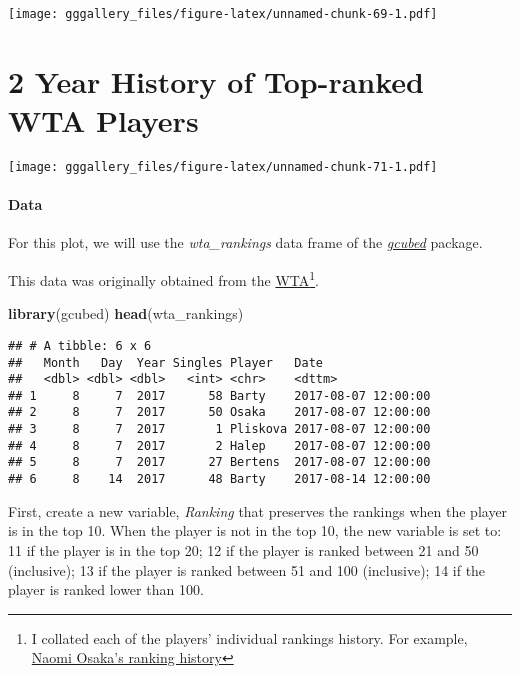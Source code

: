 \documentclass[]{book}
\newenvironment{Shaded}{\begin{snugshade}}{\end{snugshade}}
\newcommand{\KeywordTok}[1]{\textcolor[rgb]{0.13,0.29,0.53}{\textbf{#1}}}
\newcommand{\NormalTok}[1]{#1}
\let\rmarkdownfootnote\footnote%
\def\footnote{\protect\rmarkdownfootnote}
\begin{document}
\texttt{[image: gggallery\_files/figure-latex/unnamed-chunk-69-1.pdf]}

\hypertarget{wta}{%
\chapter*{2 Year History of Top-ranked WTA Players}\label{wta}}

\texttt{[image: gggallery\_files/figure-latex/unnamed-chunk-71-1.pdf]}

\hypertarget{wtadata}{%
\subsubsection*{Data}\label{wtadata}}

For this plot, we will use the \emph{wta\_rankings} data frame of the \protect\hyperlink{gcubed}{\emph{gcubed}} package.

This data was originally obtained from the \href{https://www.wtatennis.com/}{WTA}\footnote{I collated each of the players' individual rankings history. For example, \href{https://www.wtatennis.com/players/player/319998/title/naomi-osaka-0\#ranking}{Naomi Osaka's ranking history}}.

\begin{Shaded}
\begin{Highlighting}[]
\KeywordTok{library}\NormalTok{(gcubed)}
\KeywordTok{head}\NormalTok{(wta_rankings)}
\end{Highlighting}
\end{Shaded}

\begin{verbatim}
## # A tibble: 6 x 6
##   Month   Day  Year Singles Player   Date               
##   <dbl> <dbl> <dbl>   <int> <chr>    <dttm>             
## 1     8     7  2017      58 Barty    2017-08-07 12:00:00
## 2     8     7  2017      50 Osaka    2017-08-07 12:00:00
## 3     8     7  2017       1 Pliskova 2017-08-07 12:00:00
## 4     8     7  2017       2 Halep    2017-08-07 12:00:00
## 5     8     7  2017      27 Bertens  2017-08-07 12:00:00
## 6     8    14  2017      48 Barty    2017-08-14 12:00:00
\end{verbatim}

First, create a new variable, \emph{Ranking} that preserves the rankings when the player is in the top 10. When the player is not in the top 10, the new variable is set to: 11 if the player is in the top 20; 12 if the player is ranked between 21 and 50 (inclusive); 13 if the player is ranked between 51 and 100 (inclusive); 14 if the player is ranked lower than 100.
\end{document}
